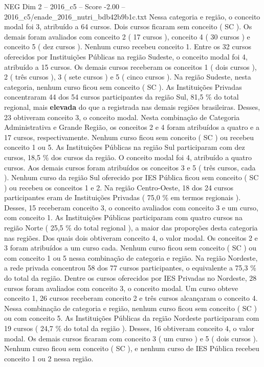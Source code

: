 \begin{textsample}{NEG Dim 2 – 2016\_c5 – Score -2.00 – 2016\_c5/enade\_2016\_nutri\_bdb42b9b1c.txt}
Nessa categoria e região, o conceito modal foi 3, atribuído a 64 cursos.
Dois cursos ficaram sem conceito ( SC ).
Os demais foram avaliados com conceito 2 ( 17 cursos ), conceito 4 ( 30 cursos ) e conceito 5 ( dez cursos ).
Nenhum curso recebeu conceito 1.
Entre os 32 cursos oferecidos por Instituições Públicas na região Sudeste, o conceito modal foi 4, atribuído a 15 cursos.
Os demais cursos receberam os conceitos 1 ( dois cursos ), 2 ( três cursos ), 3 ( sete cursos ) e 5 ( cinco cursos ).
Na região Sudeste, nesta categoria, nenhum curso ficou sem conceito ( SC ).
As Instituições Privadas concentraram 44 dos 54 cursos participantes da região Sul, 81,5 \% do total regional, mais \textbf{elevada} do que a registrada nas demais regiões brasileiras.
Desses, 23 obtiveram conceito 3, o conceito modal.
Nesta combinação de Categoria Administrativa e Grande Região, os conceitos 2 e 4 foram atribuídos a quatro e a 17 cursos, respectivamente.
Nenhum curso ficou sem conceito ( SC ) ou recebeu conceito 1 ou 5.
As Instituições Públicas na região Sul participaram com dez cursos, 18,5 \% dos cursos da região.
O conceito modal foi 4, atribuído a quatro cursos.
Aos demais cursos foram atribuídos os conceitos 3 e 5 ( três cursos, cada ).
Nenhum curso da região Sul oferecido por IES Pública ficou sem conceito ( SC ) ou recebeu os conceitos 1 e 2.
Na região Centro-Oeste, 18 dos 24 cursos participantes eram de Instituições Privadas ( 75,0 \% em termos regionais ).
Desses, 15 receberam conceito 3, o conceito avaliados com conceito 3 e um curso, com conceito 1.
As Instituições Públicas participaram com quatro cursos na região Norte ( 25,5 \% do total regional ), a maior das proporções desta categoria nas regiões.
Dos quais dois obtiveram conceito 4, o valor modal.
Os conceitos 2 e 3 foram atribuídos a um curso cada.
Nenhum curso ficou sem conceito ( SC ) ou com conceito 1 ou 5 nessa combinação de categoria e região.
Na região Nordeste, a rede privada concentrou 58 dos 77 cursos participantes, o equivalente a 75,3 \% do total da região.
Dentre os cursos oferecidos por IES Privadas no Nordeste, 28 cursos foram avaliados com conceito 3, o conceito modal.
Um curso obteve conceito 1, 26 cursos receberam conceito 2 e três cursos alcançaram o conceito 4.
Nessa combinação de categoria e região, nenhum curso ficou sem conceito ( SC ) ou com conceito 5.
As Instituições Públicas da região Nordeste participaram com 19 cursos ( 24,7 \% do total da região ).
Desses, 16 obtiveram conceito 4, o valor modal.
Os demais cursos ficaram com conceito 3 ( um curso ) e 5 ( dois cursos ).
Nenhum curso ficou sem conceito ( SC ), e nenhum curso de IES Pública recebeu conceito 1 ou 2 nessa região.

\end{textsample}
